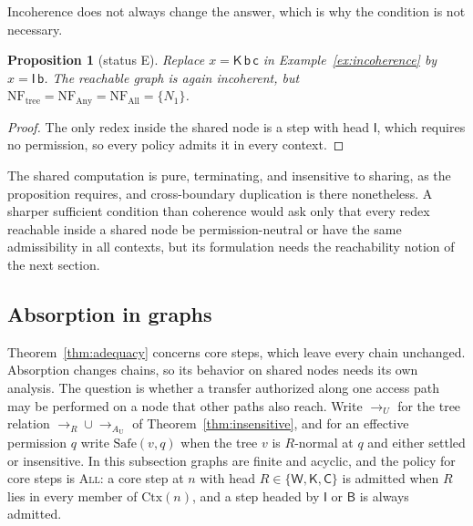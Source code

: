 \documentclass[11pt]{article}
\newtheorem{proposition}[theorem]{Proposition}
\theoremstyle{definition}
\theoremstyle{remark}
\newcommand{\cI}{\mathsf{I}}
\newcommand{\cB}{\mathsf{B}}
\newcommand{\cC}{\mathsf{C}}
\newcommand{\cK}{\mathsf{K}}
\newcommand{\cW}{\mathsf{W}}
\newcommand{\Ctx}{\mathrm{Ctx}}
\newcommand{\NF}{\mathrm{NF}}
\newcommand{\Et}{status E}
\begin{document}
Incoherence does not always change the answer, which is why the condition is not necessary.

\begin{proposition}[\Et]\label{prop:unobservable}
Replace $x=\cK\,\mathsf b\,\mathsf c$ in Example~\ref{ex:incoherence} by $x=\cI\,\mathsf b$. The reachable graph is again incoherent, but $\NF_{\mathrm{tree}}=\NF_{\mathrm{Any}}=\NF_{\mathrm{All}}=\{N_1\}$.
\end{proposition}

\begin{proof}
The only redex inside the shared node is a step with head $\cI$, which requires no permission, so every policy admits it in every context.
\end{proof}

The shared computation is pure, terminating, and insensitive to sharing, as the proposition requires, and cross-boundary duplication is there nonetheless. A sharper sufficient condition than coherence would ask only that every redex reachable inside a shared node be permission-neutral or have the same admissibility in all contexts, but its formulation needs the reachability notion of the next section.

\subsection{Absorption in graphs}\label{sec:graphabs}

Theorem~\ref{thm:adequacy} concerns core steps, which leave every chain unchanged. Absorption changes chains, so its behavior on shared nodes needs its own analysis. The question is whether a transfer authorized along one access path may be performed on a node that other paths also reach. Write $\to_U$ for the tree relation $\to_R\cup\to_{A_{\mathrm U}}$ of Theorem~\ref{thm:insensitive}, and for an effective permission $q$ write $\mathrm{Safe}(v,q)$ when the tree $v$ is $R$-normal at $q$ and either settled or insensitive. In this subsection graphs are finite and acyclic, and the policy for core steps is \textsc{All}: a core step at $n$ with head $R\in\{\cW,\cK,\cC\}$ is admitted when $R$ lies in every member of $\Ctx(n)$, and a step headed by $\cI$ or $\cB$ is always admitted.
\end{document}
